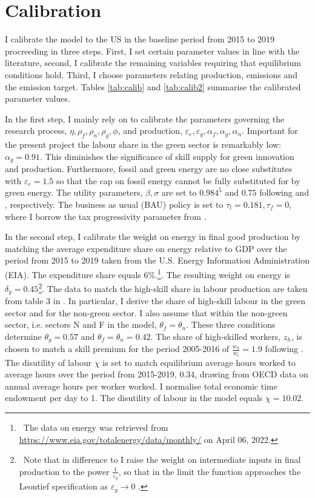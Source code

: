 \section{Calibration}\label{sec:calib}
I calibrate the model to the US in the baseline period from 2015 to 2019 procreeding in three steps. First, I set certain parameter values in line with the literature, second, I calibrate the remaining variables requiring that equilibrium conditions hold. Third, I choose parameters relating production, emissions and the emission target. Tables \ref{tab:calib} and \ref{tab:calib2} summarise the calibrated parameter values.

In the first step, I mainly rely on \cite{Fried2018ClimateAnalysis} to calibrate the parameters governing the research process, $\eta, \rho_f,\rho_n, \rho_g, \phi $, and production, $\varepsilon_e, \varepsilon_y, \alpha_f, \alpha_g, \alpha_n$.  Important for the present project the labour share in the green sector is remarkably low: $\alpha_g=0.91$. This diminishes the significance of skill supply for green innovation and production. Furthermore, fossil and green energy are no close substitutes with $\varepsilon_e=1.5$ so that the cap on fossil energy cannot be fully substituted for by green energy. The utility parameters, $\beta, \sigma$ are set to $0.984^5$ and $0.75$ following \cite{Barrage2019OptimalPolicy} and \cite{Chetty2011AreMargins}, respectively. The business as usual (BAU) policy is set to $\tau_l=0.181, \tau_f=0$, where I borrow the tax progressivity parameter from \cite{Heathcote2017OptimalFramework}. 

In the second step, I calibrate the weight on energy in final good production by matching the average expenditure share on energy relative to GDP over the period from 2015 to 2019 taken from the U.S. Energy Information Administration (EIA). The expenditure share equals 6\%.\footnote{\ The data on energy was retrieved from \url{https://www.eia.gov/totalenergy/data/monthly/}
 on April 06, 2022.}. The resulting weight on energy is $\delta_y=0.45$\footnote{\ Note that in difference to \cite{Fried2018ClimateAnalysis} I raise the weight on intermediate inputs in final production to the power $\frac{1}{\varepsilon_y}$, so that in the limit the function approaches the Leontief specification as $\varepsilon_y\rightarrow 0$ \citep{Herrendorf2014GrowthTransformation}.}. The data to match the high-skill share in labour production are taken from table 3 in \cite{Consoli2016DoCapital}. In particular, I derive the share of high-skill labour in the green sector and for the non-green sector. I also assume that within the non-green sector, i.e. sectors N and F in the model, $\theta_f=\theta_n$.  These three conditions determine $\theta_g=0.57$ and $\theta_f=\theta_n=0.42$. The share of high-skilled workers, $z_h$, is chosen to match a skill premium for the period 2005-2016 of $\frac{w_h}{w_l}=1.9$ following \cite{Slavik2020WagePremium}. The disutility of labour $\chi$ is set to match equilibrium average hours worked to average hours over the period from 2015-2019, 0.34, drawing from OECD data on annual average hours per worker worked. I normalise total economic time endowment per day to 1. The disutility of labour in the model equals $\chi=10.02$. 

